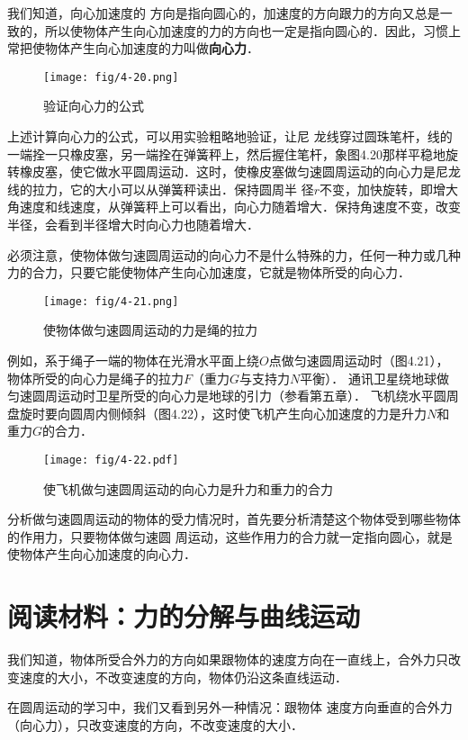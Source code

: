 我们知道，向心加速度的
方向是指向圆心的，加速度的方向跟力的方向又总是一致的，所以使物体产生向心加速度的力的方向也一定是指向圆心的．因此，习惯上常把使物体产生向心加速度的力叫做\textbf{向心力}．

\begin{figure}\centering
\texttt{[image: fig/4-20.png]}
\caption{验证向心力的公式}
\end{figure}


上述计算向心力的公式，可以用实验粗略地验证，让尼
龙线穿过圆珠笔杆，线的一端拴一只橡皮塞，另一端拴在弹簧秤上，然后握住笔杆，象图4.20那样平稳地旋转橡皮塞，使它做水平圆周运动．这时，使橡皮塞做匀速圆周运动的向心力是尼龙线的拉力，它的大小可以从弹簧秤读出．保持圆周半
径$r$不变，加快旋转，即增大角速度和线速度，从弹簧秤上可以看出，向心力随着增大．保持角速度不变，改变半径，会看到半径增大时向心力也随着增大．

必须注意，使物体做匀速圆周运动的向心力不是什么特殊的力，任何一种力或几种力的合力，只要它能使物体产生向心加速度，它就是物体所受的向心力．
\begin{figure}\centering
\texttt{[image: fig/4-21.png]}
\caption{使物体做匀速圆周运动的力是绳的拉力
}
\end{figure}

例如，系于绳子一端的物体在光滑水平面上绕$O$点做匀速圆周运动时（图4.21），物体所受的向心力是绳子的拉力$F$（重力$G$与支持力$N$平衡）． 通讯卫星绕地球做匀速圆周运动时卫星所受的向心力是地球的引力（参看第五章）． 飞机绕水平圆周盘旋时要向圆周内侧倾斜（图4.22），这时使飞机产生向心加速度的力是升力$N$和重力$G$的合力．
\begin{figure}\centering
\texttt{[image: fig/4-22.pdf]}
\caption{使飞机做匀速圆周运动的向心力是升力和重力的合力}
\end{figure}

分析做匀速圆周运动的物体的受力情况时，首先要分析清楚这个物体受到哪些物体的作用力，只要物体做匀速圆
周运动，这些作用力的合力就一定指向圆心，就是使物体产生向心加速度的向心力．

\section*{阅读材料：力的分解与曲线运动}
我们知道，物体所受合外力的方向如果跟物体的速度方向在一直线上，合外力只改变速度的大小，不改变速度的方向，物体仍沿这条直线运动．

在圆周运动的学习中，我们又看到另外一种情况：跟物体
速度方向垂直的合外力（向心力），只改变速度的方向，不改变速度的大小．

